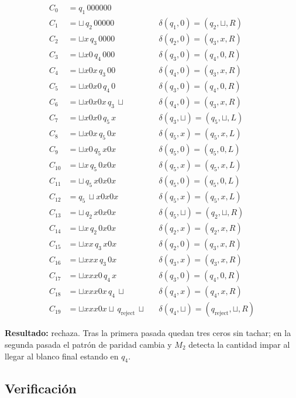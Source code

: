 \documentclass[11pt,a4paper]{article}
\theoremstyle{plain}
\theoremstyle{definition}
\theoremstyle{remark}
\newcommand{\qreject}{q_{\text{reject}}}
\newcommand{\blank}{\sqcup}
\begin{document}
\begin{align*}
C_0 &= q_1\,000000 \\
C_1 &= \blank\,q_2\,00000        &&\delta(q_1,0)=(q_2,\blank,R)\\
C_2 &= \blank x\,q_3\,0000       &&\delta(q_2,0)=(q_3,x,R)\\
C_3 &= \blank x0\,q_4\,000       &&\delta(q_3,0)=(q_4,0,R)\\
C_4 &= \blank x0x\,q_3\,00       &&\delta(q_4,0)=(q_3,x,R)\\
C_5 &= \blank x0x0\,q_4\,0       &&\delta(q_3,0)=(q_4,0,R)\\
C_6 &= \blank x0x0x\,q_3\,\blank &&\delta(q_4,0)=(q_3,x,R)\\
C_7 &= \blank x0x0\,q_5\,x       &&\delta(q_3,\blank)=(q_5,\blank,L)\\
C_8 &= \blank x0x\,q_5\,0x       &&\delta(q_5,x)=(q_5,x,L)\\
C_9 &= \blank x0\,q_5\,x0x       &&\delta(q_5,0)=(q_5,0,L)\\
C_{10} &= \blank x\,q_5\,0x0x    &&\delta(q_5,x)=(q_5,x,L)\\
C_{11} &= \blank\,q_5\,x0x0x     &&\delta(q_5,0)=(q_5,0,L)\\
C_{12} &= q_5\,\blank x0x0x      &&\delta(q_5,x)=(q_5,x,L)\\
C_{13} &= \blank\,q_2\,x0x0x     &&\delta(q_5,\blank)=(q_2,\blank,R)\\
C_{14} &= \blank x\,q_2\,0x0x    &&\delta(q_2,x)=(q_2,x,R)\\
C_{15} &= \blank xx\,q_3\,x0x    &&\delta(q_2,0)=(q_3,x,R)\\
C_{16} &= \blank xxx\,q_3\,0x    &&\delta(q_3,x)=(q_3,x,R)\\
C_{17} &= \blank xxx0\,q_4\,x    &&\delta(q_3,0)=(q_4,0,R)\\
C_{18} &= \blank xxx0x\,q_4\,\blank &&\delta(q_4,x)=(q_4,x,R)\\
C_{19} &= \blank xxx0x\blank\,\qreject\,\blank &&\delta(q_4,\blank)=(\qreject,\blank,R)
\end{align*}

\textbf{Resultado:} rechaza. Tras la primera pasada quedan tres ceros sin
tachar; en la segunda pasada el patr\'on de paridad cambia y $M_2$ detecta
la cantidad impar al llegar al blanco final estando en $q_4$.

\subsection*{Verificaci\'on}
\end{document}
